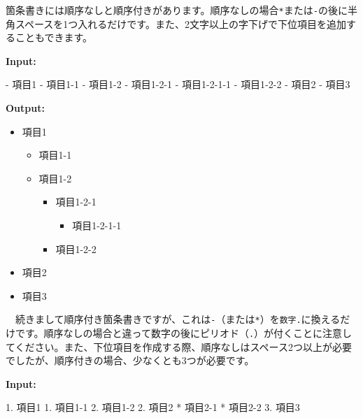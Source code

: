 \documentclass[
  a4paper,
  pandoc,
  ja=standard,
  jafont=haranoaji]{bxjsbook}
\newenvironment{Shaded}{\begin{snugshade}}{\end{snugshade}}
\newcommand{\NormalTok}[1]{\textcolor[rgb]{0.00,0.48,0.65}{#1}}
\newcommand{\SpecialStringTok}[1]{\textcolor[rgb]{0.13,0.47,0.30}{#1}}
\providecommand{\tightlist}{%
  \setlength{\itemsep}{0pt}\setlength{\parskip}{0pt}}
\begin{document}
箇条書きには順序なしと順序付きがあります。順序なしの場合\texttt{*}または\texttt{-}の後に半角スペースを1つ入れるだけです。また、2文字以上の字下げで下位項目を追加することもできます。

\textbf{Input:}

\begin{Shaded}
\begin{Highlighting}[]
\SpecialStringTok{{-} }\NormalTok{項目1}
\SpecialStringTok{  {-} }\NormalTok{項目1{-}1}
\SpecialStringTok{  {-} }\NormalTok{項目1{-}2}
\SpecialStringTok{    {-} }\NormalTok{項目1{-}2{-}1}
\SpecialStringTok{      {-} }\NormalTok{項目1{-}2{-}1{-}1}
\SpecialStringTok{    {-} }\NormalTok{項目1{-}2{-}2}
\SpecialStringTok{{-} }\NormalTok{項目2}
\SpecialStringTok{{-} }\NormalTok{項目3}
\end{Highlighting}
\end{Shaded}

\textbf{Output:}

\begin{itemize}
\tightlist
\item
  項目1

  \begin{itemize}
  \tightlist
  \item
    項目1-1
  \item
    項目1-2

    \begin{itemize}
    \tightlist
    \item
      項目1-2-1

      \begin{itemize}
      \tightlist
      \item
        項目1-2-1-1
      \end{itemize}
    \item
      項目1-2-2
    \end{itemize}
  \end{itemize}
\item
  項目2
\item
  項目3
\end{itemize}

　続きまして順序付き箇条書きですが、これは\texttt{-}（または\texttt{*}）を\texttt{数字.}に換えるだけです。順序なしの場合と違って数字の後にピリオド（\texttt{.}）が付くことに注意してください。また、下位項目を作成する際、順序なしはスペース2つ以上が必要でしたが、順序付きの場合、少なくとも3つが必要です。

\textbf{Input:}

\begin{Shaded}
\begin{Highlighting}[]
\SpecialStringTok{1. }\NormalTok{項目1}
\SpecialStringTok{   1. }\NormalTok{項目1{-}1}
\SpecialStringTok{   2. }\NormalTok{項目1{-}2}
\SpecialStringTok{2. }\NormalTok{項目2}
\SpecialStringTok{   * }\NormalTok{項目2{-}1}
\SpecialStringTok{   * }\NormalTok{項目2{-}2}
\SpecialStringTok{3. }\NormalTok{項目3}
\end{Highlighting}
\end{Shaded}
\end{document}
